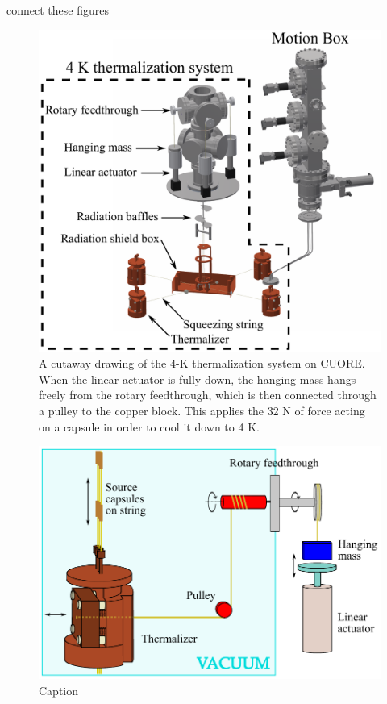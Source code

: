 \color{red}connect these figures \color{black}
\begin{figure}[htbp]
    \centering
    \includegraphics[width=0.8\linewidth]{Figures/thermalization_system_labeled.pdf}
    \caption[A cutaway drawing of the 4-K thermalization system on CUORE.]
    {A cutaway drawing of the 4-K thermalization system on CUORE.
    When the linear actuator is fully down, the hanging mass hangs freely from the rotary feedthrough, which is then connected through a pulley to the copper block.
    This applies the 32 N of force acting on a capsule in order to cool it down to 4 K.}
    \label{fig:DCS_4K_thermalizer}
\end{figure}

\begin{figure}[htbp]
    \centering
    \includegraphics[width=0.8\linewidth]{Figures/Thermalizer_schematic_labeled.pdf}
    \caption{Caption}
    \label{fig:DCS_4K_schematic}
\end{figure}

